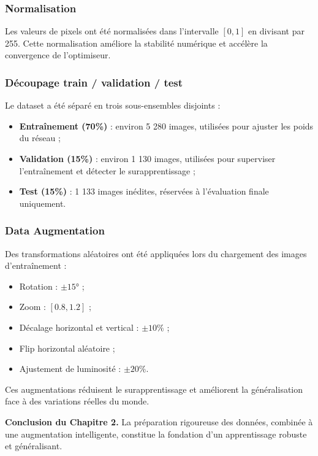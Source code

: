 \documentclass[11pt,a4paper]{article}
\begin{document}
\subsubsection{Normalisation}
Les valeurs de pixels ont été normalisées dans l'intervalle \([0, 1]\) en divisant par 255. Cette normalisation améliore la stabilité numérique et accélère la convergence de l'optimiseur.

\subsubsection{Découpage train / validation / test}
Le dataset a été séparé en trois sous-ensembles disjoints :
\begin{itemize}
    \item \textbf{Entraînement (70\%)} : environ 5 280 images, utilisées pour ajuster les poids du réseau ;
    \item \textbf{Validation (15\%)} : environ 1 130 images, utilisées pour superviser l'entraînement et détecter le surapprentissage ;
    \item \textbf{Test (15\%)} : 1 133 images inédites, réservées à l'évaluation finale uniquement.
\end{itemize}

\subsubsection{Data Augmentation}
Des transformations aléatoires ont été appliquées lors du chargement des images d'entraînement :
\begin{itemize}
    \item Rotation : $\pm 15°$ ;
    \item Zoom : $[0.8, 1.2]$ ;
    \item Décalage horizontal et vertical : $\pm 10\%$ ;
    \item Flip horizontal aléatoire ;
    \item Ajustement de luminosité : $\pm 20\%$.
\end{itemize}

Ces augmentations réduisent le surapprentissage et améliorent la généralisation face à des variations réelles du monde.

\textbf{Conclusion du Chapitre 2.} La préparation rigoureuse des données, combinée à une augmentation intelligente, constitue la fondation d'un apprentissage robuste et généralisant.

\newpage
\end{document}
